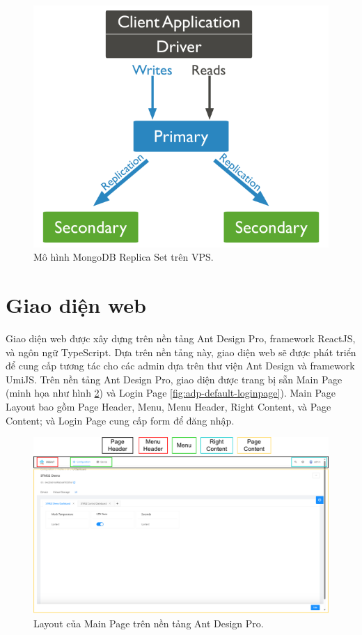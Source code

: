 \begin{figure}[htp]
\centering
\includegraphics[width=0.7\linewidth]{images/replica-set-read-write-operations-primary.bakedsvg.png}
\caption{Mô hình MongoDB Replica Set trên VPS.}
\label{fig:MongoDB-Replication-Model}
\end{figure}

\section{Giao diện web}

Giao diện web được xây dựng trên nền tảng Ant Design Pro, framework ReactJS, và ngôn ngữ TypeScript. Dựa trên nền tảng này, giao diện web sẽ được phát triển để cung cấp tương tác cho các admin dựa trên thư viện Ant Design và framework UmiJS.
Trên nền tảng Ant Design Pro, giao diện được trang bị sẵn Main Page (minh họa như hình \ref{fig:adp-default-mainpage}) và Login Page \ref{fig:adp-default-loginpage}). Main Page Layout bao gồm Page Header, Menu, Menu Header, Right Content, và Page Content; và Login Page cung cấp form để đăng nhập.

\begin{figure}[htp]
\centering
\includegraphics[width=1.0\linewidth]{images/Thesis-Page-13-adp-default-mainpage.pdf}
\caption{Layout của Main Page trên nền tảng Ant Design Pro.}
\label{fig:adp-default-mainpage}
\end{figure}


